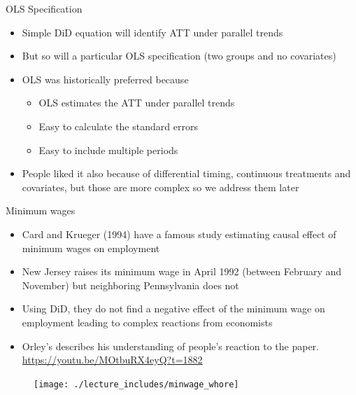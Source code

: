 \documentclass{beamer}
\begin{document}
\begin{frame}{OLS Specification}
	
	\begin{itemize}
	\item Simple DiD equation will identify ATT under parallel trends
	\item But so will a particular OLS specification (two groups and no covariates)
	\item OLS was historically preferred because
		\begin{itemize}
		\item OLS estimates the ATT under parallel trends
		\item Easy to calculate the standard errors
		\item Easy to include multiple periods
		\end{itemize}
	\item People liked it also because of differential timing, continuous treatments and covariates, but those are more complex so we address them later
	\end{itemize}
\end{frame}

\begin{frame}{Minimum wages}

\begin{itemize}
\item Card and Krueger (1994) have a famous study estimating causal effect of minimum wages on employment
\item  New Jersey raises its minimum wage in April 1992 (between February and November) but neighboring Pennsylvania does not
\item Using DiD, they do not find a negative effect of the minimum wage on employment leading to complex reactions from economists
\item Orley's describes his understanding of people's reaction to the paper.  \\ \url{https://youtu.be/MOtbuRX4eyQ?t=1882}
\end{itemize}

\end{frame}

\begin{frame}
	\begin{figure}
	\texttt{[image: ./lecture\_includes/minwage\_whore]}
	\end{figure}
\end{frame}
\end{document}
